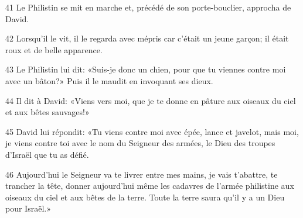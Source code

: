 
41 Le Philistin se mit en marche et, précédé de son porte-bouclier, approcha de David.

42 Lorsqu’il le vit, il le regarda avec mépris car c’était un jeune garçon; il était roux et de belle apparence.

43 Le Philistin lui dit: «Suis-je donc un chien, pour que tu viennes contre moi avec un bâton?» Puis il le maudit en invoquant ses dieux.

44 Il dit à David: «Viens vers moi, que je te donne en pâture aux oiseaux du ciel et aux bêtes sauvages!»

45 David lui répondit: «Tu viens contre moi avec épée, lance et javelot, mais moi, je viens contre toi avec le nom du Seigneur des armées, le Dieu des troupes d’Israël que tu as défié.

46 Aujourd’hui le Seigneur va te livrer entre mes mains, je vais t’abattre, te trancher la tête, donner aujourd’hui même les cadavres de l’armée philistine aux oiseaux du ciel et aux bêtes de la terre. Toute la terre saura qu’il y a un Dieu pour Israël.»
